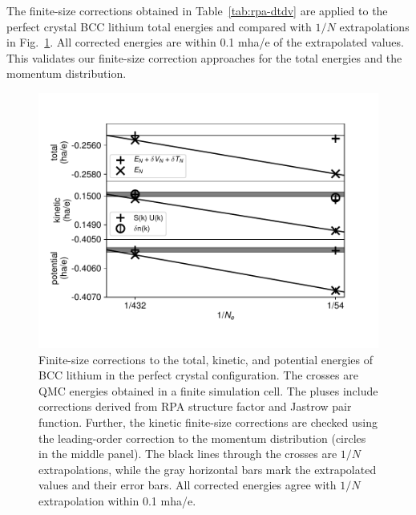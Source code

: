 \documentclass[aps,prl,superscriptaddress]{revtex4-1}
\begin{document}
The finite-size corrections obtained in Table~\ref{tab:rpa-dtdv} are applied to the perfect crystal BCC lithium total energies and compared with $1/N$ extrapolations in Fig.~\ref{fig:etot-fsc}. All corrected energies are within 0.1 mha/e of the extrapolated values. This validates our finite-size correction approaches for the total energies and the momentum distribution.

\begin{figure}[h]
\includegraphics[width=0.8\linewidth]{li53_extrap-srat-with-dnk}
\caption{Finite-size corrections to the total, kinetic, and potential energies of BCC lithium in the perfect crystal configuration. The crosses are QMC energies obtained in a finite simulation cell. The pluses include corrections derived from RPA structure factor and Jastrow pair function. Further, the kinetic finite-size corrections are checked using the leading-order correction to the momentum distribution (circles in the middle panel). The black lines through the crosses are $1/N$ extrapolations, while the gray horizontal bars mark the extrapolated values and their error bars. All corrected energies agree with $1/N$ extrapolation within 0.1 mha/e.}
\label{fig:etot-fsc}
\end{figure}



\end{document}
